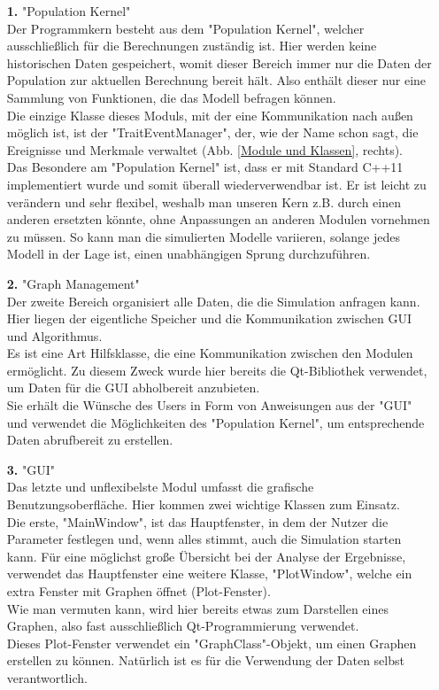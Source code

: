 \documentclass[11pt, a4paper, german]{article}
\theoremstyle{plain}
\begin{document}
	\begin{itemize}
		\item [\textbf{1.}] "{}Population Kernel"{}\\
		Der Programmkern besteht aus dem "{}Population Kernel"{}, welcher ausschließlich für die Berechnungen zuständig ist. Hier werden keine historischen Daten gespeichert, womit dieser Bereich immer nur die Daten der Population zur aktuellen Berechnung bereit hält. Also enthält dieser nur eine Sammlung von Funktionen, die das Modell befragen können.\\
		Die einzige Klasse dieses Moduls, mit der eine Kommunikation nach außen möglich ist, ist der "{}TraitEventManager"{}, der, wie der Name schon sagt, die Ereignisse und Merkmale verwaltet (Abb. \ref{Module und Klassen}, rechts).\\
		Das Besondere am "{}Population Kernel"{} ist, dass er mit Standard C++11 implementiert wurde und somit überall wiederverwendbar ist. Er ist leicht zu verändern und sehr flexibel, weshalb man unseren Kern z.B. durch einen anderen ersetzten könnte, ohne Anpassungen an anderen Modulen vornehmen zu müssen. So kann man die simulierten Modelle variieren, solange jedes Modell in der Lage ist, einen unabhängigen Sprung durchzuführen.\\
		\item [\textbf{2.}] "{}Graph Management"{}\\
		Der zweite Bereich organisiert alle Daten, die die Simulation anfragen kann. Hier liegen der eigentliche Speicher und die Kommunikation zwischen GUI und Algorithmus.\\
		Es ist eine Art Hilfsklasse, die eine Kommunikation zwischen den Modulen ermöglicht. Zu diesem Zweck wurde hier bereits die Qt-Bibliothek verwendet, um Daten für die GUI abholbereit anzubieten.\\
		Sie erhält die Wünsche des Users in Form von Anweisungen aus der "{}GUI"{} und verwendet die Möglichkeiten des "{}Population Kernel"{}, um entsprechende Daten abrufbereit zu erstellen.
		\newpage
		\item [\textbf{3.}] "{}GUI"{}\\
		Das letzte und unflexibelste Modul umfasst die grafische Benutzungsoberfläche. Hier kommen zwei wichtige Klassen zum Einsatz.\\
		Die erste, "{}MainWindow"{}, ist das Hauptfenster, in dem der Nutzer die Parameter festlegen und, wenn alles stimmt, auch die Simulation starten kann. Für eine möglichst große Übersicht bei der Analyse der Ergebnisse, verwendet das Hauptfenster eine weitere Klasse, "{}PlotWindow"{}, welche ein extra Fenster mit Graphen öffnet (Plot-Fenster).\\
		Wie man vermuten kann, wird hier bereits etwas zum Darstellen eines Graphen, also fast ausschließlich Qt-Programmierung verwendet.\\
		Dieses Plot-Fenster verwendet ein "{}GraphClass"{}-Objekt, um einen Graphen erstellen zu können. Natürlich ist es für die Verwendung der Daten selbst verantwortlich.
	\end{itemize}	
 	
\end{document}
